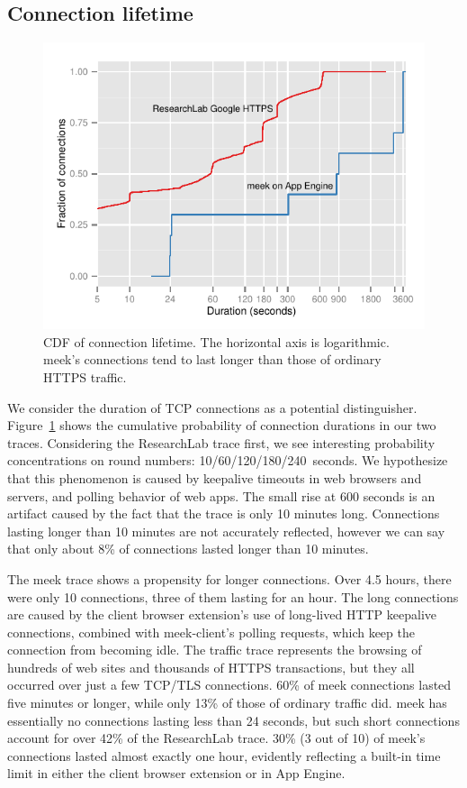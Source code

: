 \documentclass{sig-alternate}
\newcommand{\meekclient}{\mbox{meek-client}\xspace}
\newcommand{\meek}{meek\xspace}
\newcommand{\lbl}{ResearchLab\xspace}
\begin{document}
\subsection{Connection lifetime}

\begin{figure}
\centering
\includegraphics[width=\linewidth]{flowduration}
\caption{
CDF of connection lifetime.
The horizontal axis is logarithmic.
\meek's connections tend to last longer than those of ordinary HTTPS traffic.
}
\label{fig:duration}
\end{figure}


We consider the duration of TCP connections as a potential distinguisher.
Figure~\ref{fig:duration} shows the cumulative probability
of connection durations in our two traces.
Considering the \lbl trace first,
we see interesting probability concentrations on
round numbers: 10/60/120/180/240~seconds.
We hypothesize that this phenomenon is caused by
keepalive timeouts in web browsers and servers,
and polling behavior of web apps.
The small rise at 600 seconds is an artifact caused
by the fact that the trace is only 10 minutes long.
Connections lasting longer than 10 minutes are not accurately reflected,
however we can say that only about 8\% of connections lasted longer than 10 minutes.

The \meek trace shows a propensity for longer connections.
Over 4.5 hours, there were only 10 connections,
three of them lasting for an hour.
The long connections are caused by the client browser extension's
use of long-lived HTTP keepalive connections,
combined with \meekclient's polling requests,
which keep the connection from becoming idle.
The traffic trace represents the browsing of hundreds of web sites
and thousands of HTTPS transactions, but they all
occurred over just a few TCP/TLS connections.
60\% of \meek connections lasted five minutes or longer,
while only 13\% of those of ordinary traffic did.
\meek has essentially no connections lasting less than 24 seconds,
but such short connections account for over 42\% of the \lbl trace.
30\% (3 out of 10) of \meek's connections lasted almost exactly one hour,
evidently reflecting a built-in time limit in either the client browser extension
or in App Engine.
\end{document}
